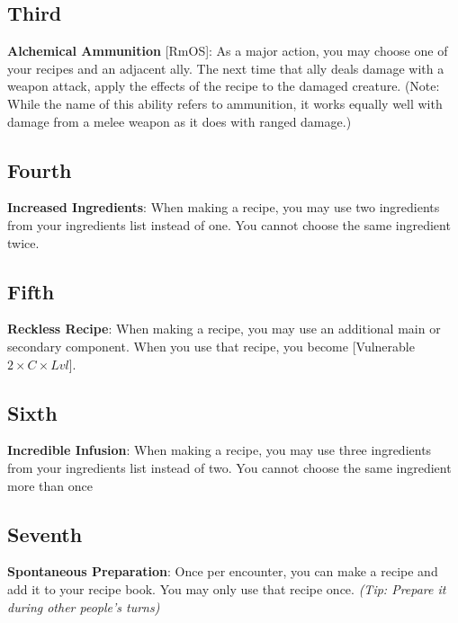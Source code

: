 \begin{multicols*}{2}
\subsection*{Third \Facet\perk}
\textbf{Alchemical Ammunition} [RmOS]: As a major action, you may choose one of your recipes and an adjacent ally. The next time that ally deals damage with a weapon attack, apply the effects of the recipe to the damaged creature. (Note: While the name of this ability refers to ammunition, it works equally well with damage from a melee weapon as it does with ranged damage.)

\subsection*{Fourth \Facet}
\textbf{Increased Ingredients}: When making a recipe, you may use two ingredients from your ingredients list instead of one. You cannot choose the same ingredient twice.

\subsection*{Fifth \Facet\perk}
\textbf{Reckless Recipe}: When making a recipe, you may use an additional main or secondary component. When you use that recipe, you become [Vulnerable $2\times C \times Lvl$].

\subsection*{Sixth \Facet}
\textbf{Incredible Infusion}: When making a recipe, you may use three ingredients from your ingredients list instead of two. You cannot choose the same ingredient more than once

\subsection*{Seventh \Facet\perk}
\textbf{Spontaneous Preparation}: Once per encounter, you can make a recipe and add it to your recipe book. You may only use that recipe once. \emph{(Tip: Prepare it during other people’s turns)}


\end{multicols*}
